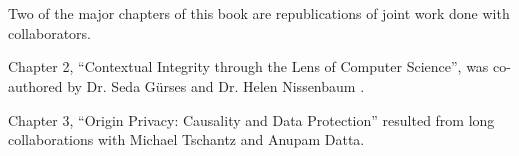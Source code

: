 \documentclass[../thesis.tex]{subfiles}
\begin{document}
 
 \section{}

 Two of the major chapters of this book are republications of joint work
 done with collaborators.

 Chapter 2, ``Contextual Integrity through the Lens of Computer Science'',
 was co-authored by Dr. Seda G{\"u}rses and Dr. Helen Nissenbaum \cite{benthall2017contextual}.

 Chapter 3, ``Origin Privacy: Causality and Data Protection'' resulted from
 long collaborations with Michael Tschantz and Anupam Datta. 
 
 
\end{document}
